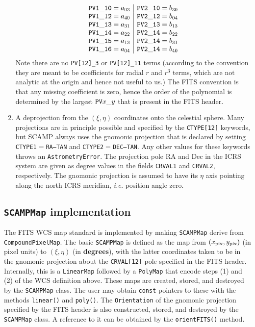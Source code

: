 \documentclass[11pt,preprint,flushrt]{aastex}
\begin{document}
\begin{enumerate}
\begin{equation}
\begin{array}{c|c}
{\tt PV1\_10} = a_{03} & {\tt PV2\_10} = b_{30} \\
{\tt PV1\_12} = a_{40} & {\tt PV2\_12} = b_{04} \\
{\tt PV1\_13} = a_{31} & {\tt PV2\_13} = b_{13} \\
{\tt PV1\_14} = a_{22} & {\tt PV2\_14} = b_{22} \\
{\tt PV1\_15} = a_{13} & {\tt PV2\_14} = b_{31} \\
{\tt PV1\_16} = a_{04} & {\tt PV2\_14} = b_{40}
\end{array}
\end{equation}
Note there are no {\tt PV[12]\_3} or {\tt PV[12]\_11} terms (according to the convention they are meant to be coefficients for radial $r$ and $r^3$ terms, which are not analytic at the origin and hence not useful to us.)  The FITS convention is that any missing coefficient is zero, hence the order of the polynomial is determined by the largest ${\tt PV}x\_y$ that is present in the FITS header.
\item A deprojection from the $(\xi,\eta)$ coordinates onto the celestial sphere.  Many projections are in principle possible and specified by the {\tt CTYPE[12]} keywords, but SCAMP always uses the gnomonic projection that is declared by setting {\tt CTYPE1}$=${\tt RA---TAN} and {\tt CTYPE2}$=${\tt DEC--TAN}.  Any other values for these keywords throws an {\tt AstrometryError}.  The projection pole RA and Dec in the ICRS system are given as degree values in the fields {\tt CRVAL1} and {\tt CRVAL2}, respectively.  The gnomonic projection is assumed to have its $\eta$ axis pointing along the north ICRS meridian, {\it i.e.} position angle zero.
\end{enumerate}

\subsection{{\tt SCAMPMap} implementation}
The FITS WCS map standard is implemented by making {\tt SCAMPMap} derive from {\tt CompoundPixelMap}.  The basic {\tt SCAMPMap} is defined as the map from $(x_{\rm pix}, y_{\rm pix})$ (in pixel units) to $(\xi,\eta)$ (in {\bf degrees}), with the latter coordinates taken to be in the gnomonic projection about the {\tt CRVAL[12]} pole specified in the FITS header.  Internally, this is a {\tt LinearMap} followed by a {\tt PolyMap} that encode steps (1) and (2) of the WCS definition above.  These maps are created, stored, and destroyed by the {\tt SCAMPMap} class.  The user may obtain {\tt const} pointers to these with the methods {\tt linear()} and {\tt poly()}.  The {\tt Orientation} of the gnomonic projection specified by the FITS header is also constructed, stored, and destroyed by the {\tt SCAMPMap} class.  A reference to it can be obtained by the {\tt orientFITS()} method.
\end{document}
